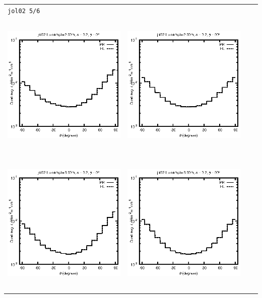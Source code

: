 \begin{tabular}{c c c c}
\multicolumn{4}{l}{\texttt{jol02 5/6}} \\
\includegraphics[height=7cm]{../eps/jol02_Lu_sample_2.00m_fwd.eps} &
\includegraphics[height=7cm]{../eps/jol02_Lu_sample_2.00m_cross.eps} \\
\includegraphics[height=7cm]{../eps/jol02_Lu_sample_3.00m_fwd.eps} &
\includegraphics[height=7cm]{../eps/jol02_Lu_sample_3.00m_cross.eps} \\

\end{tabular}
